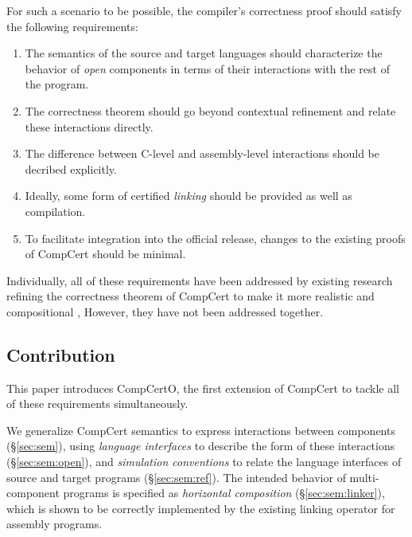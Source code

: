 \documentclass[sigplan,10pt,review,anonymous]{acmart}\settopmatter{printfolios=true,printccs=false,printacmref=false}
\begin{document}
For such a scenario to be possible,
the compiler's correctness proof
should satisfy the following requirements:
\begin{enumerate}
\item \label{req:opensem}
  The semantics of the source and target languages
  should characterize the behavior of \emph{open} components
  in terms of their interactions with the rest of the program.
\item \label{req:opensim}
  The correctness theorem
  should go beyond contextual refinement and relate
  these interactions directly.
\item \label{req:openabs}
  The difference between C-level and assembly-level
  interactions should be decribed explicitly.
\item \label{req:linking}
  Ideally,
  some form of certified \emph{linking}
  should be provided as well as compilation.
\item \label{req:complexity}
  To facilitate integration into the official release,
  changes to the existing proofs of CompCert
  should be minimal.
\end{enumerate}
Individually,
all of these requirements have been addressed
by existing research
refining the correctness theorem of CompCert
to make it more realistic and compositional
\cite{qompcert,sepcompcert,compcompcert,compcerttso,compcertshm,compcertm},
However, they have not been addressed together.



\subsection{Contribution} %

This paper introduces CompCertO,
the first extension of CompCert to tackle
all of these requirements simultaneously.

We generalize CompCert semantics
to express interactions between components (\S\ref{sec:sem}),
using \emph{language interfaces}
to describe the form of these interactions (\S\ref{sec:sem:open}),
and \emph{simulation conventions}
to relate the language interfaces
of source and target programs (\S\ref{sec:sem:ref}).
The intended behavior of
multi-component programs is specified as
\emph{horizontal composition} (\S\ref{sec:sem:linker}),
which is shown to be correctly implemented
by the existing linking operator for assembly programs.
\end{document}

